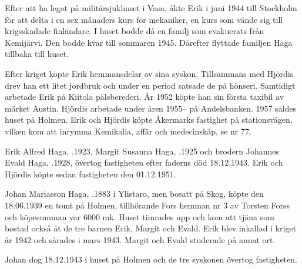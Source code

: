 Efter att ha legat på militärsjukhuset i Vasa, åkte Erik i juni 1944 till Stockholm för att delta i en sex månaders kurs för mekaniker, en kurs som vände sig till krigsskadade finländare. I huset bodde då en familj som evakuerats från Kemijärvi. Den bodde kvar till sommaren 1945. Därefter flyttade familjen Haga tillbaka till huset.

Efter kriget köpte Erik hemmansdelar av sina syskon. Tillsammans med Hjördis drev han ett litet jordbruk och under en period satsade de på  hönseri. Samtidigt arbetade Erik på Kiitola pälsberederi. År 1952 köpte han sin första taxibil av märket Austin. Hjördis arbetade under åren 1955-- på Andelsbanken. 1957 såldes huset på Holmen. Erik och Hjördis köpte Åkermarks fastighet på stationsvägen, vilken kom att inrymma Kemikalia, affär och medecinskåp, se nr 77.
\begin{jhchildren}
  \item {}
  \item {}
  \item {}
\end{jhchildren}


%
Erik Alfred Haga, .1923,  Margit Susanna Haga, .1925 och brodern Johannes Evald Haga, .1928, övertog fastigheten efter faderns död 18.12.1943. Erik och Hjördis köpte sedan fastigheten den 01.12.1951.\jhvspace{}


%
Johan Mariasson Haga, .1883 i Ylistaro, men bosatt på Skog, köpte den 18.06.1939 en tomt på Holmen, tillhörande Fors hemman nr 3 av Torsten Forss och köpesumman var 6000 mk. Huset timrades upp och kom att tjäna som bostad också åt de tre barnen Erik, Margit och Evald. Erik blev inkallad i kriget år 1942 och sårades i mars 1943. Margit och Evald studerade på annat ort.

Johan dog 18.12.1943 i huset på Holmen och de tre syskonen övertog fastigheten.



%


